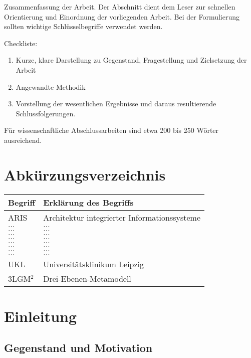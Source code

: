 \documentclass[headsepline,titlepage,twoside,12pt]{report}
\begin{document}
Zusammenfassung der Arbeit. Der Abschnitt dient dem Leser zur schnellen Orientierung und Einordnung der vorliegenden Arbeit. Bei der Formulierung sollten wichtige Schlüsselbegriffe verwendet werden. 

Checkliste:
\begin{enumerate}
\item Kurze, klare Darstellung zu Gegenstand, Fragestellung und Zielsetzung der Arbeit
\item Angewandte Methodik
\item Vorstellung der wesentlichen Ergebnisse und daraus resultierende Schlussfolgerungen.
\end{enumerate}
Für wissenschaftliche Abschlussarbeiten sind etwa 200 bis 250 Wörter ausreichend.

\chapter*{Abkürzungsverzeichnis}
\begin{tabularx}{\textwidth}{lX}
\toprule
\textrm{Begriff}			&\textrm{Erklärung des Begriffs}\\
\midrule
ARIS					&Architektur integrierter Informationssysteme\\
$\ldots$				&$\ldots$\\
$\ldots$				&$\ldots$\\
$\ldots$				&$\ldots$\\
$\ldots$				&$\ldots$\\
$\ldots$				&$\ldots$\\
$\ldots$				&$\ldots$\\
$\ldots$				&$\ldots$\\
$\ldots$				&$\ldots$\\
UKL					&Universitätsklinikum Leipzig\\
3LGM$^2$				&Drei-Ebenen-Metamodell\\

\bottomrule
\end{tabularx}

\chapter{Einleitung}
\section{Gegenstand und Motivation}
\end{document}
